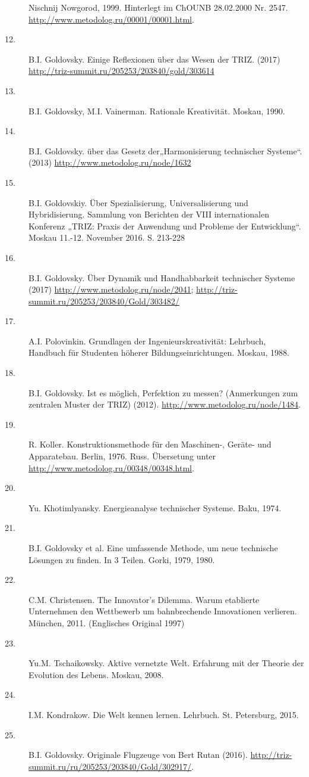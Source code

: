 \documentclass[11pt,a4paper]{article}
\begin{document}
\begin{description}
  Nischnij Nowgorod, 1999. Hinterlegt im ChOUNB 28.02.2000 Nr. 2547.
  \url{http://www.metodolog.ru/00001/00001.html}.
\item[12.] B.I. Goldovsky. Einige Reflexionen über das Wesen der TRIZ. (2017)
  \url{http://triz-summit.ru/205253/203840/gold/303614}
\item[13.] B.I. Goldovsky, M.I. Vainerman. Rationale Kreativität. Moskau,
  1990.
\item[14.] B.I. Goldovsky. über das Gesetz der„Harmonisierung technischer
  Systeme“. (2013) \url{http://www.metodolog.ru/node/1632}
\item[15.] B.I. Goldovskiy. Über Spezialisierung, Universalisierung und
  Hybridisierung. Sammlung von Berichten der VIII internationalen Konferenz
 „TRIZ: Praxis der Anwendung und Probleme der Entwicklung“. Moskau
  11.-12. November 2016. S. 213-228
\item[16.] B.I. Goldovsky. Über Dynamik und Handhabbarkeit technischer Systeme
  (2017) \url{http://www.metodolog.ru/node/2041};
  \url{http://triz-summit.ru/205253/203840/Gold/303482/}
\item[17.] A.I. Polovinkin. Grundlagen der Ingenieurskreativität: Lehrbuch,
  Handbuch für Studenten höherer Bildungseinrichtungen. Moskau, 1988.
\item[18.] B.I. Goldovsky. Ist es möglich, Perfektion zu messen? (Anmerkungen
  zum zentralen Muster der TRIZ) (2012).
  \url{http://www.metodolog.ru/node/1484}.
\item[19.] R. Koller. Konstruktionsmethode für den Maschinen-, Geräte- und
  Apparatebau. Berlin, 1976.  Russ. Übersetung unter
  \url{http://www.metodolog.ru/00348/00348.html}. 
\item[20.] Yu. Khotimlyansky. Energieanalyse technischer Systeme. Baku, 1974. 
\item[21.] B.I. Goldovsky et al. Eine umfassende Methode, um neue technische
  Lösungen zu finden. In 3 Teilen. Gorki, 1979, 1980.
\item[22.] C.M. Christensen. The Innovator's Dilemma. Warum etablierte
  Unternehmen den Wettbewerb um bahnbrechende Innovationen verlieren. München,
  2011.  (Englisches Original 1997)
\item[23.] Yu.M. Tschaikowsky. Aktive vernetzte Welt. Erfahrung mit der
  Theorie der Evolution des Lebens. Moskau, 2008.
\item[24.] I.M. Kondrakow. Die Welt kennen lernen. Lehrbuch. St. Petersburg,
  2015.
\item[25.] B.I. Goldovsky.  Originale Flugzeuge von Bert Rutan (2016).
  \url{http://triz-summit.ru/ru/205253/203840/Gold/302917/}. 
\end{description}
\end{document}
